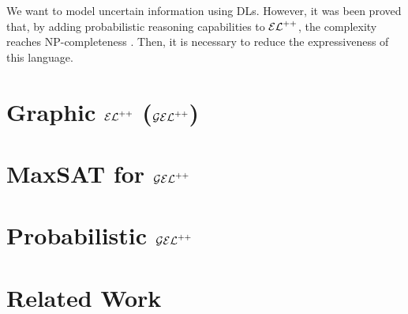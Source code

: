 We want to model uncertain information using DLs. However, it was been proved that, by adding probabilistic reasoning capabilities to $\mathcal{EL}^{++}$, the complexity reaches NP-completeness \citep{Fin2019b}. Then, it is necessary to reduce the expressiveness of this language.

\section{Graphic \texorpdfstring{$\mathcal{EL}^{++}$}{𝓔𝓛++} (\texorpdfstring{$\mathcal{GEL}^{++}$}{𝓖𝓔𝓛++})}

\section{MaxSAT for \texorpdfstring{$\mathcal{GEL}^{++}$}{𝓖𝓔𝓛++}}

\section{Probabilistic \texorpdfstring{$\mathcal{GEL}^{++}$}{𝓖𝓔𝓛++}}

\section{Related Work}